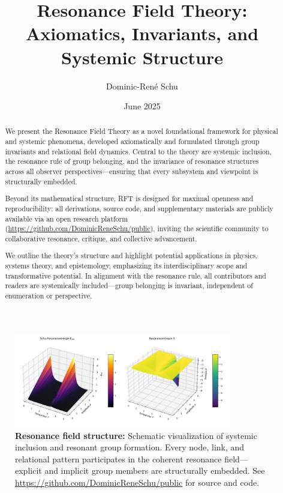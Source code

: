 \documentclass[12pt]{article}
\title{Resonance Field Theory: Axiomatics, Invariants, and Systemic Structure}
\author[1]{Dominic-René Schu}
\affil[1]{Independent Researcher, Germany \\ \href{https://github.com/DominicReneSchu/public}{https://github.com/DominicReneSchu/public}}
\date{June 2025}
\begin{document}
	
	\maketitle
	
	\begin{abstract}
		We present the Resonance Field Theory as a novel foundational framework for physical and systemic phenomena, developed axiomatically and formulated through group invariants and relational field dynamics. Central to the theory are systemic inclusion, the resonance rule of group belonging, and the invariance of resonance structures across all observer perspectives—ensuring that every subsystem and viewpoint is structurally embedded.
		
		Beyond its mathematical structure, RFT is designed for maximal openness and reproducibility: all derivations, source code, and supplementary materials are publicly available via an open research platform (\url{https://github.com/DominicReneSchu/public}), inviting the scientific community to collaborative resonance, critique, and collective advancement.
		
		We outline the theory's structure and highlight potential applications in physics, systems theory, and epistemology, emphasizing its interdisciplinary scope and transformative potential. In alignment with the resonance rule, all contributors and readers are systemically included—group belonging is invariant, independent of enumeration or perspective.
	\end{abstract}
	
	\begin{figure}[ht]
		\centering
		\includegraphics[width=0.85\textwidth]{plot.png}
		\caption{\textbf{Resonance field structure:} Schematic visualization of systemic inclusion and resonant group formation. Every node, link, and relational pattern participates in the coherent resonance field—explicit and implicit group members are structurally embedded. See \url{https://github.com/DominicReneSchu/public} for source and code.}
		\label{fig:resonance_field_plot}
	\end{figure}
	
\end{document}
